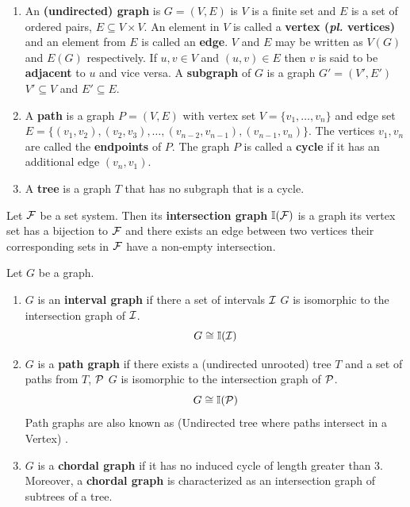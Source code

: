\begin{definition}
  \label{def:graphtree}
  \begin{enumerate}
    \hangindent {}
  \item An \textbf{(undirected) graph} is $G = (V,E)$ is \stt $V$ is a
    finite set and $E$ is a set of ordered pairs, $E \subseteq V
    \times V$. An element in $V$ is called a \textbf{vertex
      (\emph{pl.} vertices)} and an element from $E$ is called an
    \textbf{edge}. $V$ and $E$ may be written as $V(G)$ and $E(G)$
    respectively. If $u,v \in V$ and $(u,v) \in E$ then $v$ is said to
    be \textbf{adjacent} to $u$ and vice versa. A \textbf{subgraph} of
    $G$ is a graph $G' = (V',E')$ \stt $V' \subseteq V$ and $E'
    \subseteq E$.

  \item A \textbf{path} is a graph $P = (V,E)$ with vertex set $V =
    \{v_1,\ldots,v_n\}$ and edge set $E= \{ (v_1,v_2),(v_2,v_3),
    \ldots,(v_{n-2},v_{n-1}),(v_{n-1},v_{n})\}$. The vertices $v_1,
    v_n$ are called the \textbf{endpoints} of $P$. The graph $P$ is
    called a \textbf{cycle} if it has an additional edge $(v_n,v_1)$.

  \item A \textbf{tree} is a graph $T$ that has no subgraph that is a
    cycle.
  \end{enumerate}
\end{definition}


\begin{definition}
  \label{def:intersectiongraph}
  Let ${\cal F}$ be a set system. Then its \textbf{intersection graph}
  $\mathbb I({\cal F})$ is a graph \stt its vertex set has a bijection to ${\cal F}$
  and there exists an edge between two vertices \iff their
  corresponding sets in ${\cal F}$ have a non-empty intersection.
\end{definition}

\begin{definition}
  \label{def:pathgraph}
  Let $G$ be a graph.
  \begin{enumerate}
  \hangindent {}
  \item $G$ is an \textbf{interval graph} if there a set of intervals
    ${\cal I}$ \stt $G$ is isomorphic to the intersection graph of
    ${\cal I}$. \[G \cong \mathbb I({\cal I})\]
  \item $G$ is a \textbf{path graph} if there exists a (undirected
    unrooted) tree $T$ and a set of paths from $T$, ${\cal P}$ \stt $G$ is
    isomorphic to the intersection graph of ${\cal P}$. \[G \cong
    \mathbb I({\cal P})\] Path graphs are also known as \uvgraphs (Undirected
    tree where paths intersect in a Vertex) \cite{mw86}.
  \item $G$ is a \textbf{chordal graph} if it has no induced cycle of
    length greater than 3. Moreover, a \textbf{chordal graph} is
    characterized as an intersection graph of subtrees of a tree.
  \end{enumerate}
\end{definition}

